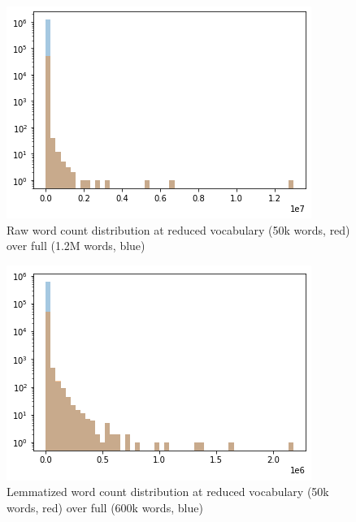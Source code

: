 \documentclass{article}
\begin{document}
\begin{figure}[H]
    \centering
    \includegraphics[width=1.0\linewidth]{vocab_not_norm_50k.png}
    \caption{Raw word count distribution at reduced vocabulary (50k words, red) over full (1.2M words, blue)}
    \label{fig:circle}
\end{figure}

\begin{figure}[H]
    \centering
    \includegraphics[width=1.0\linewidth]{voc.png}
    \caption{Lemmatized word count distribution at reduced vocabulary (50k words, red) over full (600k words, blue)}
    \label{fig:circle}
\end{figure}
\end{document}
